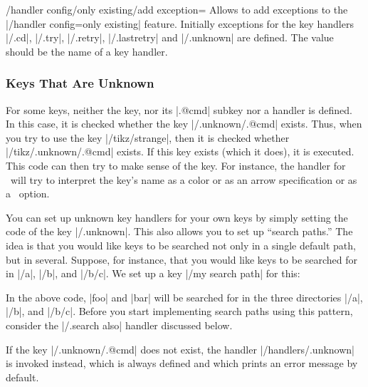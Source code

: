 \begin{key}{/handler config/only existing/add exception=}
  Allows to add exceptions to the |/handler config=only existing|
  feature. Initially exceptions for the key handlers
  |/.cd|, |/.try|, |/.retry|, |/.lastretry| and |/.unknown| are
  defined. The value  should be the name of a
  key handler.
\end{key}



\subsubsection{Keys That Are Unknown}
\label{sec:pgf:unknown:keys}

For some keys, neither the key, nor its |.@cmd| subkey nor
a handler is defined. In this case, it is checked whether
the key |/.unknown/.@cmd| exists. Thus, when you try to
use the key |/tikz/strange|, then it is checked whether
|/tikz/.unknown/.@cmd| exists. If this key exists (which it does), it is
executed. This code can then try to make sense of the key. For
instance, the handler for \tikzname\ will try to interpret the key's
name as a color or as an arrow specification or as a \pgfname\
option.

You can set up unknown key handlers for your own keys by simply setting
the code of the key \meta{my path prefix}|/.unknown|. This also allows
you to set up ``search paths.'' The idea is that you would like keys to
be searched not only in a single default path, but in
several. Suppose, for instance, that you would like keys to be
searched
for in |/a|, |/b|, and |/b/c|. We set up a key |/my search path| for
this:
\begin{codeexample}
\end{codeexample}
In the above code, |foo| and |bar| will be searched for in the three
directories  |/a|, |/b|, and |/b/c|. Before you start implementing
search paths using this pattern, consider the |/.search also| handler
discussed below.

If the key |/.unknown/.@cmd| does not exist, the
handler |/handlers/.unknown| is invoked instead, which is always
defined and which prints an error message by default.

